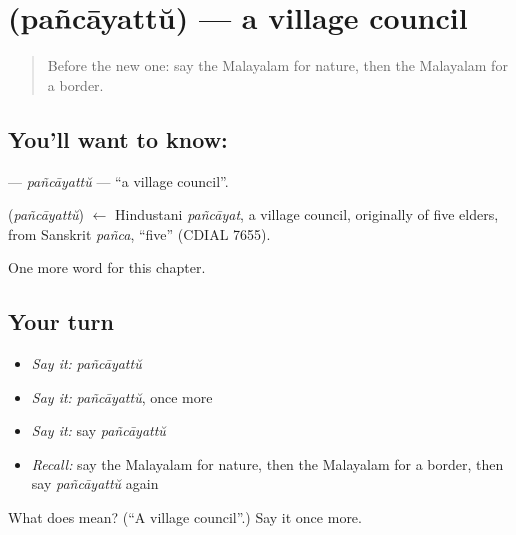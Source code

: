\section[\texorpdfstring{\ml{പഞ്ചായത്ത്} (pañcāyattŭ)}{പഞ്ചായത്ത് (pañcāyattŭ)}]{ (pañcāyattŭ) — a village council}

\label{lesson:ML-C316-pancayattu}



\begin{quote}
Before the new one: say the Malayalam for nature, then the Malayalam for a border.
\end{quote}

\subsection*{You'll want to know: }
\textbf{} — \emph{pañcāyattŭ} — \textquotedblleft{}a village council\textquotedblright{}.

\begin{cousinweb}
\textbf{} (\emph{pañcāyattŭ}) $\leftarrow$ Hindustani \emph{pañcāyat}, a village council, originally of five elders, from Sanskrit \emph{pañca}, \textquotedblleft{}five\textquotedblright{} (CDIAL 7655).
\end{cousinweb}

\begin{grammarlens}[title={What you've built}]
One more word for this chapter.
\end{grammarlens}

\subsection*{Your turn}
\begin{itemize}
\raggedright
  \item \emph{Say it:} \emph{pañcāyattŭ}
  \item \emph{Say it:} \emph{pañcāyattŭ}, once more
  \item \emph{Say it:} say \emph{pañcāyattŭ}
  \item \emph{Recall:} say the Malayalam for nature, then the Malayalam for a border, then say \emph{pañcāyattŭ} again
\end{itemize}

\begin{tcolorbox}[breakable,colback=teal!4,colframe=teal!35!black,title={Before you move on}]
What does  mean? (\textquotedblleft{}A village council\textquotedblright{}.) Say it once more.
\end{tcolorbox}
